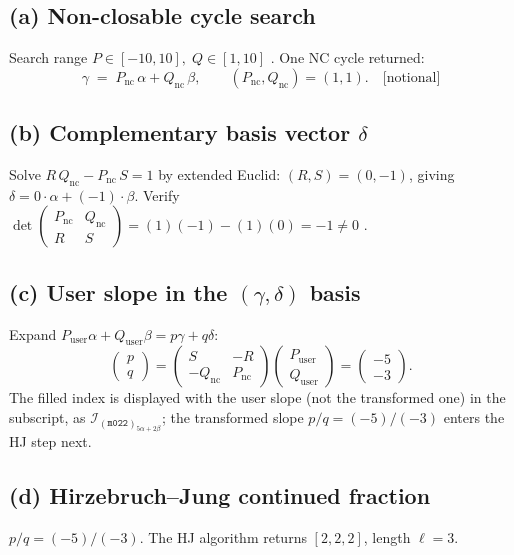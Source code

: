 \documentclass[11pt,a4paper]{article}
\newcommand{\Ifill}[2]{\mathcal{I}_{(#1)_{#2}}}
\newcommand{\pass}{{\color{green!55!black}\ding{51}}}
\begin{document}
\subsection*{(a) Non-closable cycle search}
Search range \(P\in[-10,10],\; Q\in[1,10]\) .  One
NC cycle returned:
\[
\gamma \;=\; P_{\text{nc}}\,\alpha + Q_{\text{nc}}\,\beta, \qquad
(P_{\text{nc}}, Q_{\text{nc}}) = (1, 1). \quad \text{[notional]}
\]

\subsection*{(b) Complementary basis vector \(\delta\)}
Solve \(R\,Q_{\text{nc}} - P_{\text{nc}}\,S = 1\) by extended Euclid:
\((R, S) = (0, -1)\), giving \(\delta = 0\cdot\alpha + (-1)\cdot\beta\).
Verify
\(\det\!\begin{pmatrix}P_{\text{nc}}&Q_{\text{nc}}\\R&S\end{pmatrix}
  = (1)(-1) - (1)(0) = -1 \ne 0\) \pass.

\subsection*{(c) User slope in the \((\gamma,\delta)\) basis}
Expand \(P_{\text{user}}\alpha+Q_{\text{user}}\beta = p\gamma + q\delta\):
\[
\begin{pmatrix}p\\q\end{pmatrix}
=
\begin{pmatrix} S & -R \\ -Q_{\text{nc}} & P_{\text{nc}} \end{pmatrix}
\begin{pmatrix} P_{\text{user}} \\ Q_{\text{user}} \end{pmatrix}
=
\begin{pmatrix} -5 \\ -3 \end{pmatrix}.
\]
The filled index is displayed with the user slope (not the transformed
one) in the subscript, as
\(\Ifill{\texttt{m022}}{5\alpha + 2\beta}\); the transformed slope
\(p/q = (-5)/(-3)\) enters the HJ step next.

\subsection*{(d) Hirzebruch--Jung continued fraction}
\(p/q = (-5)/(-3)\).  The HJ algorithm returns \([2, 2, 2]\), length
\(\ell = 3\). 
\end{document}
